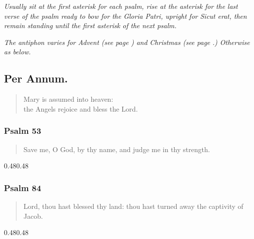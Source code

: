 \documentclass[12pt,a5paper]{memoir}
\newcommand{\rubrics}[1]{\noindent\textit{#1}}
\newcommand{\setupParallel}{\begin{Parallel}{0.48\textwidth}{0.48\textwidth}}
\begin{document}
\rubrics{Usually sit at the first asterisk for each psalm, rise at the asterisk for the last verse of the psalm ready to bow for the \emph{Gloria Patri}, upright for \emph{Sicut erat}, then remain standing until the first asterisk of the next psalm.}

\rubrics{The antiphon varies for Advent (see page \pageref{missusest}) and Christmas (see page \pageref{oadmirabile}.) Otherwise as below.}

\subsection*{Per Annum.}


\label{assumpta}

\begin{verse}
Mary is assumed into heaven:\\
the Angels rejoice and bless the Lord.
\end{verse}

\subsubsection*{Psalm 53}


\begin{verse}
Save me, O God, by thy name, and judge me in thy strength.
\end{verse}

\setupParallel

\end{Parallel}

\subsubsection*{Psalm 84}


\begin{verse}
Lord, thou hast blessed thy land: thou hast turned away the captivity of Jacob.
\end{verse}

\setupParallel

\end{Parallel}
\end{document}
